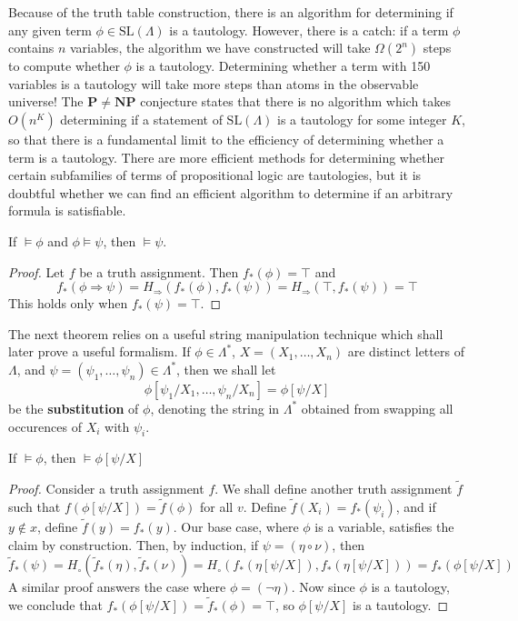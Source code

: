 Because of the truth table construction, there is an algorithm for determining if any given term $\phi \in \text{SL}(\Lambda)$ is a tautology. However, there is a catch: if a term $\phi$ contains $n$ variables, the algorithm we have constructed will take $\Omega(2^n)$ steps to compute whether $\phi$ is a tautology. Determining whether a term with 150 variables is a tautology will take more steps than atoms in the observable universe! The $\mathbf{P} \neq \mathbf{NP}$ conjecture states that there is no algorithm which takes $O(n^K)$ determining if a statement of $\text{SL}(\Lambda)$ is a tautology for some integer $K$, so that there is a fundamental limit to the efficiency of determining whether a term is a tautology. There are more efficient methods for determining whether certain subfamilies of terms of propositional logic are tautologies, but it is doubtful whether we can find an efficient algorithm to determine if an arbitrary formula is satisfiable.

\begin{theorem}
    If $\vDash \phi$ and $\phi \vDash \psi$, then $\vDash \psi$.
\end{theorem}
\begin{proof}
    Let $f$ be a truth assignment. Then $f_*(\phi) = \top$ and
    \[ f_*(\phi \Rightarrow \psi) = H_\Rightarrow(f_*(\phi),f_*(\psi)) = H_\Rightarrow(\top, f_*(\psi)) = \top \]
    This holds only when $f_*(\psi) = \top$.
\end{proof}

The next theorem relies on a useful string manipulation technique which shall later prove a useful formalism. If $\phi \in \Lambda^*$, $X = (X_1, \dots, X_n)$ are distinct letters of $\Lambda$, and $\psi = (\psi_1, \dots, \psi_n) \in \Lambda^*$, then we shall let
%
\[ \phi[\psi_1/X_1, \dots, \psi_n/X_n] = \phi[\psi/X] \]
%
be the {\bf substitution} of $\phi$, denoting the string in $\Lambda^*$ obtained from swapping all occurences of $X_i$ with $\psi_i$.

\begin{theorem}
    If $\vDash \phi$, then $\vDash \phi[\psi/X]$
\end{theorem}
\begin{proof}
    Consider a truth assignment $f$. We shall define another truth assignment $\tilde{f}$ such that $f(\phi[\psi/X]) = \tilde{f}(\phi)$ for all $v$. Define $\tilde{f}(X_i) = f_*(\psi_i)$, and if $y \not \in x$, define $\tilde{f}(y) = f_*(y)$. Our base case, where $\phi$ is a variable, satisfies the claim by construction. Then, by induction, if $\psi = (\eta \circ \nu)$, then
    \[ \tilde{f}_*(\psi) = H_\circ(\tilde{f}_*(\eta), \tilde{f}_*(\nu)) = H_\circ(f_*(\eta[\psi/X]), f_*(\eta[\psi/X])) = f_*(\phi[\psi/X]) \]
    A similar proof answers the case where $\phi = (\neg \eta)$. Now since $\phi$ is a tautology, we conclude that $f_*(\phi[\psi/X]) = \tilde{f}_*(\phi) = \top$, so $\phi[\psi/X]$ is a tautology.
\end{proof}

